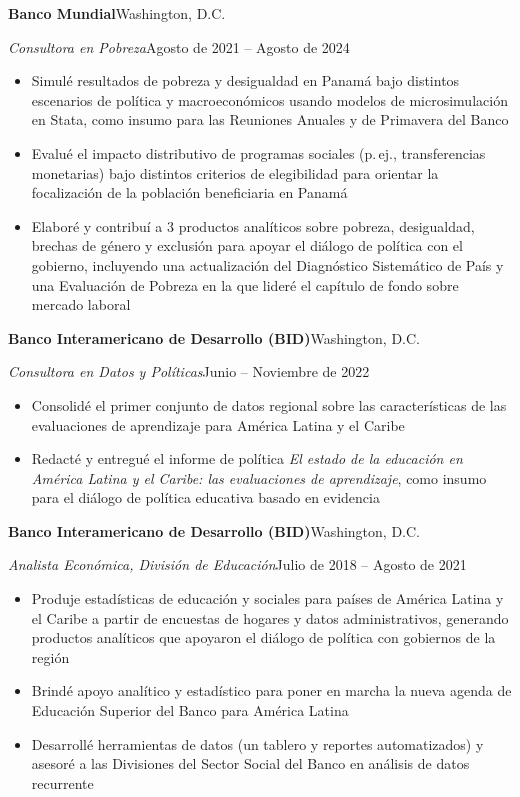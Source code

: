 \documentclass[10pt]{article}
\newcommand{\org}[2]{\noindent\textbf{#1}\hfill #2\par\vspace{0pt}}
\newcommand{\role}[2]{\noindent\textit{#1}\hfill #2\par\vspace{0pt}}
\newenvironment{cvitems}{%
  \begin{itemize}[
    leftmargin=1.2em,
    itemsep=0pt,
    parsep=0pt,
    topsep=1pt,
    label={$\bullet$}]%
}{\end{itemize}}
\newcommand{\entrygap}{\vspace{6pt}}
\begin{document}
\entrygap
\org{Banco Mundial}{Washington, D.C.}
\role{Consultora en Pobreza}{Agosto de 2021 -- Agosto de 2024}
\vspace{-1pt}
\begin{cvitems}
  \item Simul\'e resultados de pobreza y desigualdad en Panam\'a bajo distintos escenarios de pol\'itica y macroecon\'omicos usando modelos de microsimulaci\'on en Stata, como insumo para las Reuniones Anuales y de Primavera del Banco
  \item Evalu\'e el impacto distributivo de programas sociales (p.\,ej., transferencias monetarias) bajo distintos criterios de elegibilidad para orientar la focalizaci\'on de la poblaci\'on beneficiaria en Panam\'a
  \item Elabor\'e y contribu\'i a 3 productos anal\'iticos sobre pobreza, desigualdad, brechas de g\'enero y exclusi\'on para apoyar el di\'alogo de pol\'itica con el gobierno, incluyendo una actualizaci\'on del Diagn\'ostico Sistem\'atico de Pa\'is y una Evaluaci\'on de Pobreza en la que lider\'e el cap\'itulo de fondo sobre mercado laboral
\end{cvitems}

\entrygap
\org{Banco Interamericano de Desarrollo (BID)}{Washington, D.C.}
\role{Consultora en Datos y Pol\'iticas}{Junio -- Noviembre de 2022}
\vspace{-1pt}
\begin{cvitems}
  \item Consolid\'e el primer conjunto de datos regional sobre las caracter\'isticas de las evaluaciones de aprendizaje para Am\'erica Latina y el Caribe
  \item Redact\'e y entregu\'e el informe de pol\'itica \textit{El estado de la educaci\'on en Am\'erica Latina y el Caribe: las evaluaciones de aprendizaje}, como insumo para el di\'alogo de pol\'itica educativa basado en evidencia
\end{cvitems}

\entrygap
\org{Banco Interamericano de Desarrollo (BID)}{Washington, D.C.}
\role{Analista Econ\'omica, Divisi\'on de Educaci\'on}{Julio de 2018 -- Agosto de 2021}
\vspace{-1pt}
\begin{cvitems}
  \item Produje estad\'isticas de educaci\'on y sociales para pa\'ises de Am\'erica Latina y el Caribe a partir de encuestas de hogares y datos administrativos, generando productos anal\'iticos que apoyaron el di\'alogo de pol\'itica con gobiernos de la regi\'on
  \item Brind\'e apoyo anal\'itico y estad\'istico para poner en marcha la nueva agenda de Educaci\'on Superior del Banco para Am\'erica Latina
  \item Desarroll\'e herramientas de datos (un tablero y reportes automatizados) y asesor\'e a las Divisiones del Sector Social del Banco en an\'alisis de datos recurrente
\end{cvitems}
\end{document}
